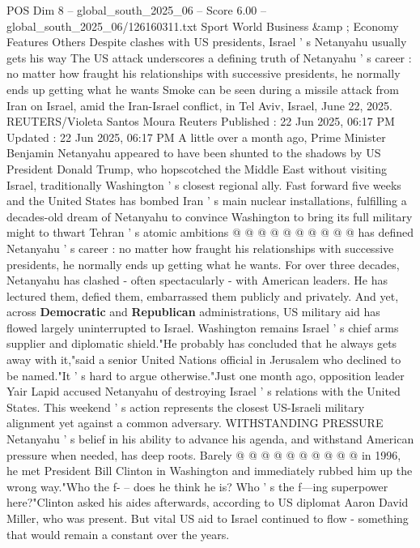 \begin{textsample}{POS Dim 8 – global\_south\_2025\_06 – Score 6.00 – global\_south\_2025\_06/126160311.txt}  \label{ex:f8_pos_420}
Sport World Business \&amp ; Economy Features Others Despite clashes with US presidents, Israel ' s Netanyahu usually gets his way The US attack underscores a defining truth of Netanyahu ' s career : no matter how fraught his relationships with successive presidents, he normally ends up getting what he wants Smoke can be seen during a missile attack from Iran on Israel, amid the Iran-Israel conflict, in Tel Aviv, Israel, June 22, 2025.
REUTERS/Violeta Santos Moura Reuters Published : 22 Jun 2025, 06:17 PM Updated : 22 Jun 2025, 06:17 PM A little over a month ago, Prime Minister Benjamin Netanyahu appeared to have been shunted to the shadows by US President Donald Trump, who hopscotched the Middle East without visiting Israel, traditionally Washington ' s closest regional ally.
Fast forward five weeks and the United States has bombed Iran ' s main nuclear installations, fulfilling a decades-old dream of Netanyahu to convince Washington to bring its full military might to thwart Tehran ' s atomic ambitions @ @ @ @ @ @ @ @ @ @ has defined Netanyahu ' s career : no matter how fraught his relationships with successive presidents, he normally ends up getting what he wants.
For over three decades, Netanyahu has clashed - often spectacularly - with American leaders.
He has lectured them, defied them, embarrassed them publicly and privately.
And yet, across \textbf{Democratic} and \textbf{Republican} administrations, US military aid has flowed largely uninterrupted to Israel.
Washington remains Israel ' s chief arms supplier and diplomatic shield."He probably has concluded that he always gets away with it,"said a senior United Nations official in Jerusalem who declined to be named."It ' s hard to argue otherwise."Just one month ago, opposition leader Yair Lapid accused Netanyahu of destroying Israel ' s relations with the United States.
This weekend ' s action represents the closest US-Israeli military alignment yet against a common adversary.
WITHSTANDING PRESSURE Netanyahu ' s belief in his ability to advance his agenda, and withstand American pressure when needed, has deep roots.
Barely @ @ @ @ @ @ @ @ @ @ in 1996, he met President Bill Clinton in Washington and immediately rubbed him up the wrong way."Who the f- -- does he think he is?
Who ' s the f---ing superpower here?"Clinton asked his aides afterwards, according to US diplomat Aaron David Miller, who was present.
But vital US aid to Israel continued to flow - something that would remain a constant over the years.

\end{textsample}
